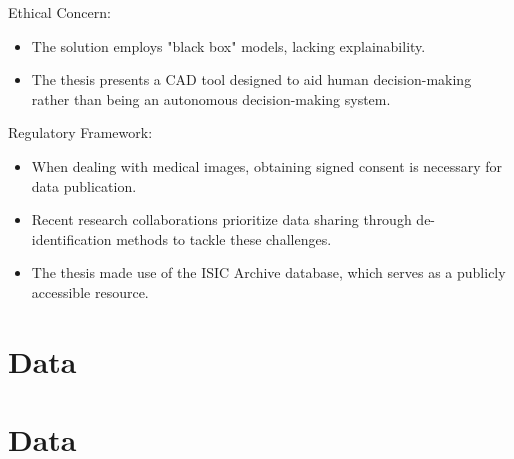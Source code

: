 \documentclass[dvipsnames,mathserif]{beamer}
\begin{document}
{\begin{frame}
    \end{frame}



    \begin{frame}

      \large Ethical Concern:
      \vspace{0.25cm}

      \footnotesize
      \begin{itemize}
        \item The solution employs "black box" models, lacking explainability.
        \item The thesis presents a CAD tool designed to aid human decision-making
          rather than being an autonomous decision-making system.
      \end{itemize}

    \end{frame}


    \begin{frame}

      \large Regulatory Framework:
      \vspace{0.25cm}

      \footnotesize

      \begin{itemize}
        \item When dealing with medical images, obtaining signed consent is
          necessary for data publication.
        \item Recent research collaborations prioritize data sharing through
          de-identification methods to tackle these challenges.
        \item The thesis made use of the ISIC Archive database, which serves as
          a publicly accessible resource.
      \end{itemize}


    \end{frame}



    \section{Data}

    \begin{frame}

    \end{frame}

    \section{Data}

}
\end{document}
